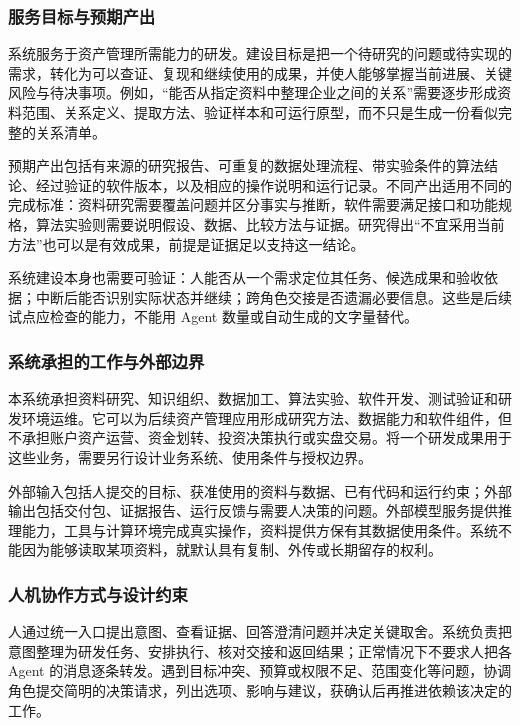 \documentclass[11pt,a4paper]{article}
\begin{document}
\subsubsection{服务目标与预期产出}

系统服务于资产管理所需能力的研发。建设目标是把一个待研究的问题或待实现的需求，转化为可以查证、复现和继续使用的成果，并使人能够掌握当前进展、关键风险与待决事项。例如，“能否从指定资料中整理企业之间的关系”需要逐步形成资料范围、关系定义、提取方法、验证样本和可运行原型，而不只是生成一份看似完整的关系清单。

预期产出包括有来源的研究报告、可重复的数据处理流程、带实验条件的算法结论、经过验证的软件版本，以及相应的操作说明和运行记录。不同产出适用不同的完成标准：资料研究需要覆盖问题并区分事实与推断，软件需要满足接口和功能规格，算法实验则需要说明假设、数据、比较方法与证据。研究得出“不宜采用当前方法”也可以是有效成果，前提是证据足以支持这一结论。

系统建设本身也需要可验证：人能否从一个需求定位其任务、候选成果和验收依据；中断后能否识别实际状态并继续；跨角色交接是否遗漏必要信息。这些是后续试点应检查的能力，不能用 Agent 数量或自动生成的文字量替代。

\subsubsection{系统承担的工作与外部边界}

本系统承担资料研究、知识组织、数据加工、算法实验、软件开发、测试验证和研发环境运维。它可以为后续资产管理应用形成研究方法、数据能力和软件组件，但不承担账户资产运营、资金划转、投资决策执行或实盘交易。将一个研发成果用于这些业务，需要另行设计业务系统、使用条件与授权边界。

外部输入包括人提交的目标、获准使用的资料与数据、已有代码和运行约束；外部输出包括交付包、证据报告、运行反馈与需要人决策的问题。外部模型服务提供推理能力，工具与计算环境完成真实操作，资料提供方保有其数据使用条件。系统不能因为能够读取某项资料，就默认具有复制、外传或长期留存的权利。

\subsubsection{人机协作方式与设计约束}

人通过统一入口提出意图、查看证据、回答澄清问题并决定关键取舍。系统负责把意图整理为研发任务、安排执行、核对交接和返回结果；正常情况下不要求人把各 Agent 的消息逐条转发。遇到目标冲突、预算或权限不足、范围变化等问题，协调角色提交简明的决策请求，列出选项、影响与建议，获确认后再推进依赖该决定的工作。
\end{document}
